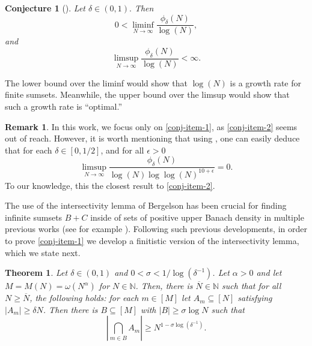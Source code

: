 \documentclass[letter, 11pt]{article}
\theoremstyle{plain} %
\newtheorem{conjecture}[theorem]{Conjecture}
\theoremstyle{definition} %
\newtheorem{remark}[theorem]{Remark}
\theoremstyle{plain}
\newcounter{MainTheoremCounter}
\newtheorem{maintheorem}[MainTheoremCounter]{Theorem}
\theoremstyle{plain}
\newcommand{\N}{\mathbb{N}}
\newcommand{\1}{\mathbbm{1}}
\begin{document}
\begin{conjecture}[{\cite[Conjecture 4.10]{Kra_Moreira_Richter_Robertson_problems}}]\label{finite-growth-rate-conj}
    Let $\delta \in (0,1).$ Then
    \begin{equation}\label{conj-item-1} 
        0<\liminf_{N \to \infty} \frac{\phi_{\delta}(N)}{\log(N)},
    \end{equation}
    and
    \begin{equation}\label{conj-item-2} 
      \limsup_{N \to \infty} \frac{\phi_{\delta}(N)}{\log(N)} < \infty.  
    \end{equation}
\end{conjecture}
The lower bound over the liminf would show that $\log(N)$ is a growth rate for finite sumsets. Meanwhile, the upper bound over the limsup would show that such a growth rate is ``optimal.'' 
\begin{remark}
  In this work, we focus only on \cref{conj-item-1}, as \cref{conj-item-2} seems out of reach. However, it is worth mentioning that using \cite[Theorem 2]{KONYAGIN201861}, one can easily deduce that for each $\delta \in [0,1/2]$, and for all $\epsilon>0$
  \begin{equation}\label{eq-limsup-modified}
      \limsup_{N \to \infty} \frac{\phi_{\delta}(N)}{\log(N) \log\log(N)^{10+\epsilon}}=0.
  \end{equation}
To our knowledge, this the closest result to \cref{conj-item-2}. 
\end{remark}



The use of the intersectivity lemma of Bergelson \cite{MR809951} has been crucial for finding infinite sumsets $B+C$ inside of sets of positive upper Banach density in multiple previous works (see for example \cite{diNasso_Golbring_Jin_Leth_Lupini_Mahlburg2015sumset,host2019short,Moreira_Richter_Robertson19}). Following such previous developments, in order to prove \cref{conj-item-1} we develop a finitistic version of the intersectivity lemma, which we state next.
\begin{maintheorem}\label{Finitistic-Intersectivity-Lemma}
      Let $\delta\in (0,1)$ and $0<\sigma<1/\log{(\delta^{-1})}$. Let $\alpha>0$ and let $M=M(N) =\omega(N^\alpha)$ for $N\in \N$. Then, there is $\overline{N}\in \N$ such that for all $N\geq \overline{N}$, the following holds: for each $m\in [M]$ let $A_{m}\subseteq [N]$ satisfying $|A_{m}|\geq \delta N$. Then there is $B\subseteq [M] $ with $|B|\geq \sigma \log{N}$ such that 
        $$\left| \bigcap_{m\in B} A_{m} \right| \geq N^{1-\sigma \log(\delta^{-1})}.$$
\end{maintheorem}
\end{document}
